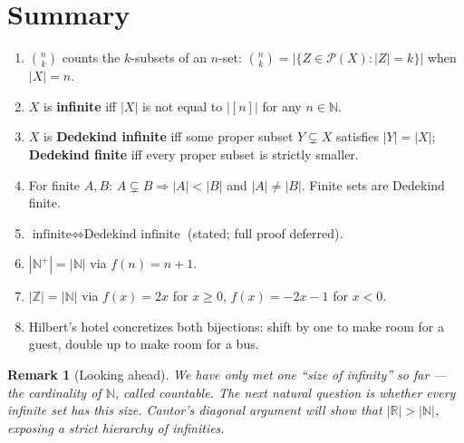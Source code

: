 \documentclass[11pt]{article}
\theoremstyle{defstyle}
\theoremstyle{thmstyle}
\theoremstyle{notstyle}
\newtheorem*{remark}{Remark}
\theoremstyle{cautionstyle}
\newcommand{\Z}{\mathbb{Z}}
\newcommand{\N}{\mathbb{N}}
\newcommand{\R}{\mathbb{R}}
\newcommand{\Np}{\mathbb{N}^{+}}
\newcommand{\Pow}{\mathcal{P}}
\begin{document}
\section{Summary}

\begin{enumerate}[leftmargin=*]
  \item $\binom{n}{k}$ counts the $k$-subsets of an $n$-set: $\binom{n}{k} = |\{Z \in \Pow(X) : |Z| = k\}|$ when $|X| = n$.
  \item $X$ is \textbf{infinite} iff $|X|$ is not equal to $|[n]|$ for any $n \in \N$.
  \item $X$ is \textbf{Dedekind infinite} iff some proper subset $Y \subsetneq X$ satisfies $|Y| = |X|$; \textbf{Dedekind finite} iff every proper subset is strictly smaller.
  \item For finite $A, B$: $A \subsetneq B \Rightarrow |A| < |B|$ and $|A| \neq |B|$. Finite sets are Dedekind finite.
  \item $\text{infinite} \iff \text{Dedekind infinite}$ (stated; full proof deferred).
  \item $|\Np| = |\N|$ via $f(n) = n + 1$.
  \item $|\Z| = |\N|$ via $f(x) = 2x$ for $x \geq 0$, $f(x) = -2x - 1$ for $x < 0$.
  \item Hilbert's hotel concretizes both bijections: shift by one to make room for a guest, double up to make room for a bus.
\end{enumerate}

\begin{notebox}
\begin{remark}[Looking ahead]
We have only met one ``size of infinity'' so far --- the cardinality of $\N$, called \emph{countable}. The next natural question is whether \emph{every} infinite set has this size. Cantor's diagonal argument will show that $|\R| > |\N|$, exposing a strict hierarchy of infinities.
\end{remark}
\end{notebox}
\end{document}
